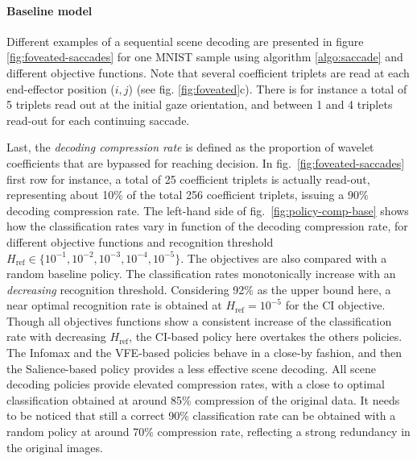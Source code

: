 \documentclass[12pt,twoside,openright]{article}
\begin{document}
\paragraph{Baseline model}
Different examples of a sequential scene decoding are presented in figure \ref{fig:foveated-saccades} for one MNIST sample using algorithm \ref{algo:saccade} and different objective functions.
Note that several coefficient triplets are read at each end-effector position ($i,j$) (see fig. \ref{fig:foveated}c). There is for instance a total of 5 triplets read out at the initial gaze orientation, and between 1 and 4 triplets read-out for each continuing saccade. 

Last, the \emph{decoding compression rate} is defined as the proportion of wavelet coefficients that are bypassed for reaching decision. In fig.~\ref{fig:foveated-saccades} first row for instance, a total of 25 coefficient triplets is  actually read-out, representing about 10\% of the total 256 coefficient triplets, issuing a 90\% decoding compression rate. 
The left-hand side of fig.~\ref{fig:policy-comp-base} shows how the classification rates vary in function of the decoding compression rate, for different objective functions and recognition threshold $H_\text{ref} \in \{10^{-1}, 10^{-2}, 10^{-3}, 10^{-4}, 10^{-5}\}$. The objectives are also compared with a random baseline policy. The classification rates monotonically increase with an \emph{decreasing} recognition threshold. Considering 92\% as the upper bound here, a near optimal recognition rate is obtained  at $H_\text{ref}=10^{-5}$ for the CI objective. Though all objectives functions show a consistent increase of the classification rate with decreasing $H_\text{ref}$, the CI{\color{Purple}-based policy} here overtakes the others {\color{Purple}policies}. The Infomax and the VFE{\color{Purple}-based policies} behave in a close-by fashion, and then the Salience{\color{Purple}-based policy} {\color{Purple} provides a less effective scene decoding}. 
{\color{Purple} All scene decoding policies provide elevated} compression rates, with a close to optimal classification obtained at around 85\% compression of the original data. It needs to be noticed that still a correct 90\% classification rate can be obtained with a random {\color{Purple} policy} at around 70\% compression rate, reflecting a strong redundancy in the original images.  
\end{document}

